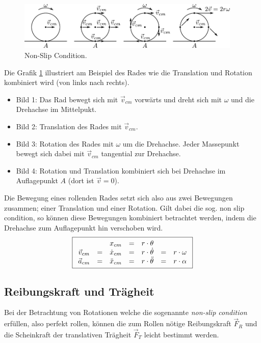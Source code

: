 \begin{figure}[h!]
	\centering
	\includegraphics[width=0.95\textwidth]{../fig/non-slip.pdf}
	\caption{Non-Slip Condition.}
	\label{fig:non-slip}
\end{figure}

\noindent
Die Grafik \ref{fig:non-slip} illustriert am Beispiel des Rades wie die 
Translation und Rotation kombiniert wird (von links nach rechts).
\begin{itemize}
	\item{Bild 1:} Das Rad bewegt sich mit $\vec{v}_{cm}$ vorwärts und
		dreht sich mit $\omega$ und die Drehachse im Mittelpukt.
	\item{Bild 2:} Translation des Rades mit $\vec{v}_{cm}$.
	\item{Bild 3:} Rotation des Rades mit $\omega$ um die Drehachse.
		Jeder Massepunkt bewegt sich dabei mit $\vec{v}_{cm}$
		tangential zur Drehachse.
	\item{Bild 4:} Rotation und Translation kombiniert sich bei
		Drehachse im Auflagepunkt $A$ (dort ist $\vec{v}=0$).
\end{itemize}
Die Bewegung eines rollenden Rades setzt sich also aus zwei Bewegungen
zusammen; einer Translation und einer Rotation. Gilt dabei die sog. 
non slip condition, so können diese Bewegungen kombiniert betrachtet 
werden, indem die Drehachse zum Auflagepunkt hin verschoben wird. 
\[ \boxed{\begin{array}{c c c c c c c}
		& & x_{cm} 
		&=& r \cdot \theta 
		& & \\
	\vec{v}_{cm} 
		&=& \dot{x}_{cm} 
		&=& r \cdot \dot{\theta }
		&=& r \cdot \omega \\
	\vec{a}_{cm} 
		&=& \ddot{x}_{cm}
		&=& r \cdot \ddot{\theta}
		&=& r \cdot \alpha
\end{array}}\]

\subsection{Reibungskraft und Trägheit}
Bei der Betrachtung von Rotationen welche die sogenannte 
\textit{non-slip condition} erfüllen, also perfekt rollen, können die 
zum Rollen nötige Reibungskraft $\vec{F}_R$ und die Scheinkraft der 
translativen Trägheit $\vec{F}_T$ leicht bestimmt werden.

